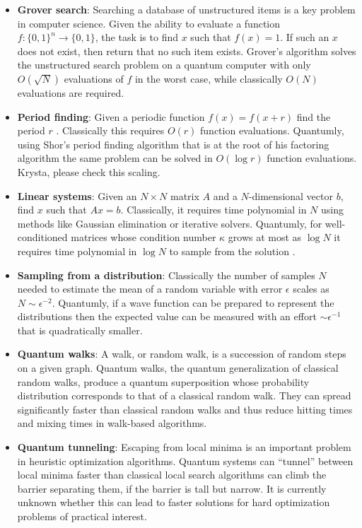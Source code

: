 \documentclass[journal]{IEEEtran}
\begin{document}
\begin{itemize}
\item {\bf Grover search}:
Searching a database of unstructured items is a key problem in computer science.  Given the ability to evaluate a function $f: \{0,1\}^n\rightarrow \{0,1\}$, the task is to find $x$ such that $f(x)=1$.  If such an $x$ does not exist, then return that no such item exists.   
Grover's algorithm solves the unstructured search problem on a quantum computer with only $O(\sqrt{N})$ evaluations of $f$ in the worst case, while classically $O(N)$ evaluations are required.  

\item {\bf Period finding}: Given a periodic function $f(x)=f(x+r)$ find the period $r$ . Classically this requires $O(r)$ function evaluations. Quantumly, using Shor's period finding algorithm that is at the root of his factoring algorithm the same problem can be solved in $O(\log r)$ function evaluations. {\color{red} Krysta, please check this scaling.}


\item {\bf Linear systems}: Given an $N\times N$ matrix $A$ and a $N$-dimensional vector $b$, find $x$ such that $Ax=b$.
Classically, it requires time polynomial in $N$ using methods like Gaussian elimination or iterative solvers. Quantumly, for well-conditioned matrices whose condition number $\kappa$ grows at most as $\log N$ it requires time polynomial in $\log N$ to sample from the solution \cite{}. 



\item  {\bf  Sampling from a distribution}: Classically the number of samples $N$ needed to estimate the mean of a random variable with error $\epsilon$  scales as $N\sim \epsilon^{-2}$. Quantumly, if a wave function can be prepared to represent the distributions then the expected value can be measured with an effort  $\sim\epsilon^{-1}$ that is quadratically smaller.

\item       {\bf Quantum walks}:
A walk, or random walk, is a succession of random steps on a given graph. Quantum walks, the quantum generalization of classical random walks, produce a quantum superposition whose probability distribution corresponds to that of a classical random walk. They can spread significantly faster than classical random walks and thus reduce hitting times and mixing times in walk-based algorithms.


\item   {\bf Quantum tunneling}: Escaping from local minima is an important problem in heuristic optimization algorithms. Quantum systems can ``tunnel'' between local minima faster than classical local search algorithms can climb the barrier separating them, if the barrier is tall but narrow. It is currently unknown whether this can lead to faster solutions for hard optimization problems of practical interest.


\end{itemize}
\end{document}
